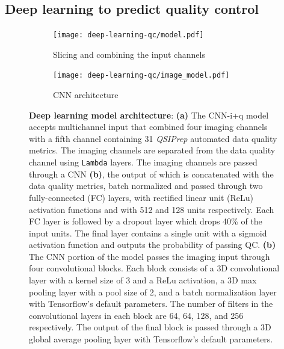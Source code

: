 \documentclass[9pt,lineno]{elife}
\begin{document}
\subsection{Deep learning to predict quality control}

\begin{figure}[tbp]
\begin{fullwidth}
    \begin{subfigure}[t]{0.6\linewidth}
    \centering
    \texttt{[image: deep-learning-qc/model.pdf]}
    \caption{Slicing and combining the input channels}
    \label{fig:dl-architecture:complete}
    \end{subfigure}
    \begin{subfigure}[t]{0.4\linewidth}
    \centering
    \texttt{[image: deep-learning-qc/image\_model.pdf]}
    \caption{CNN architecture}
    \label{fig:dl-architecture:cnn}
    \end{subfigure}
    \caption{%
        {\bf Deep learning model architecture}:
        \textbf{(a)} The CNN-i+q model accepts multichannel input that combined
        four imaging channels with a fifth channel containing 31 \emph{QSIPrep}
        automated data quality metrics. The imaging channels are separated from the data quality
        channel using \texttt{Lambda} layers. The imaging channels are passed
        through a CNN \textbf{(b)}, the output of which is concatenated with the
        data quality metrics, batch normalized and passed through two fully-connected (FC)
        layers, with rectified linear unit (ReLu) activation functions and with
        512 and 128 units respectively. Each FC layer is followed by a dropout
        layer which drops 40\% of the input units. The final layer contains a
        single unit with a sigmoid activation function and outputs the
        probability of passing QC.
        \textbf{(b)} The CNN portion of the model passes the imaging input
        through four convolutional blocks. Each block consists of a 3D
        convolutional layer with a kernel size of 3 and a ReLu activation, a 3D
        max pooling layer with a pool size of 2, and a batch normalization layer
        with Tensorflow's default parameters. The number of filters in the
        convolutional layers in each block are 64, 64, 128, and 256 respectively.
        The output of the final block is passed through a 3D global average
        pooling layer with Tensorflow's default parameters.
    }
    \label{fig:dl-architecture}
\end{fullwidth}
\end{figure}
\end{document}
